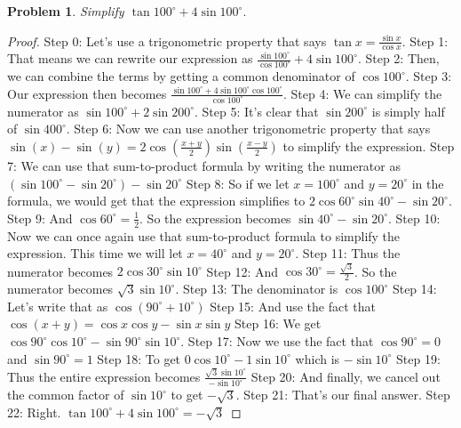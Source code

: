 \documentclass{article}
\newtheorem{theorem}{Problem}
\begin{document}
\begin{theorem}
Simplify $\tan 100^\circ + 4 \sin 100^\circ.$
\end{theorem}

\begin{proof}
Step 0: Let's use a trigonometric property that says $\tan x = \frac{\sin x}{\cos x}$.
Step 1: That means we can rewrite our expression as $\frac{\sin 100^\circ}{\cos 100^\circ} + 4 \sin 100^\circ$.
Step 2: Then, we can combine the terms by getting a common denominator of $\cos 100^\circ$.
Step 3: Our expression then becomes $\frac{\sin 100^\circ + 4\sin 100^\circ\cos 100^\circ}{\cos 100^\circ}$.
Step 4: We can simplify the numerator as $\sin 100^\circ + 2\sin 200^\circ$.
Step 5: It's clear that $\sin 200^\circ$ is simply half of $\sin 400^\circ$.
Step 6: Now we can use another trigonometric property that says $\sin(x) - \sin(y) = 2 \cos(\frac{x+y}{2})\sin(\frac{x-y}{2})$ to simplify the expression.
Step 7: We can use that sum-to-product formula by writing the numerator as $(\sin 100^\circ - \sin 20^\circ)-\sin20^\circ$
Step 8: So if we let $x=100^\circ$ and $y=20^\circ$ in the formula, we would get that the expression simplifies to $2\cos 60^\circ \sin 40^\circ - \sin 20^\circ$.
Step 9: And $\cos 60^\circ = \frac{1}{2}$. So the expression becomes $\sin 40^\circ - \sin 20^\circ$.
Step 10: Now we can once again use that sum-to-product formula to simplify the expression. This time we will let $x=40^\circ$ and $y=20^\circ$.
Step 11: Thus the numerator becomes $2 \cos 30^\circ \sin 10^\circ$
Step 12: And $\cos 30^\circ = \frac{\sqrt{3}}{2}$. So the numerator becomes $\sqrt{3}\sin 10^\circ$.
Step 13: The denominator is $\cos 100^\circ$
Step 14: Let's write that as $\cos (90^\circ + 10^\circ)$
Step 15: And use the fact that $\cos(x+y) = \cos x \cos y - \sin x \sin y$
Step 16: We get $\cos 90^\circ \cos 10^\circ - \sin 90^\circ \sin 10^\circ$.
Step 17: Now we use the fact that $\cos 90^\circ = 0$ and $\sin 90^\circ = 1$
Step 18: To get $0\cos 10^\circ - 1\sin 10^\circ$ which is $-\sin 10^\circ$
Step 19: Thus the entire expression becomes $\frac{\sqrt{3}\sin 10^\circ}{-\sin 10^\circ}$
Step 20: And finally, we cancel out the common factor of $\sin 10^\circ$ to get $-\sqrt{3}$.
Step 21: That's our final answer.
Step 22: Right. $\tan 100^\circ + 4\sin 100^\circ = -\sqrt{3}$
\end{proof}
\end{document}
